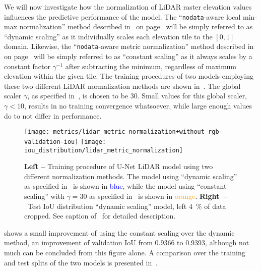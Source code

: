 We will now investigate how the normalization of LiDAR raster elevation values influences the predictive performance of the model.
The \enquote{\texttt{nodata}-aware local min-max normalization} method described in~ on page~\pageref{alg:local-min-max-scaling} will be simply referred to as \enquote{dynamic scaling} as it individually scales each elevation tile to the $[0, 1]$ domain.
Likewise, the \enquote{\texttt{nodata}-aware metric normalization} method described in~ on page~\pageref{alg:metric-normalization} will be simply referred to as \enquote{constant scaling} as it always scales by a constant factor $\gamma^{-1}$ after subtracting the minimum, regardless of maximum elevation within the given tile.
The training procedures of two models employing these two different LiDAR normalization methods are shown in~.
The global scaler $\gamma$, as specified in~, is chosen to be 30.
Small values for this global scaler, $\gamma < 10$, results in no training convergence whatsoever, while large enough values do to not differ in performance.

\begin{figure}[H]
  \centering
  \texttt{[image: metrics/lidar\_metric\_normalization+without\_rgb-validation-iou]}
  \texttt{[image: iou\_distribution/lidar\_metric\_normalization]}
  \caption{%
    \textbf{Left --} Training procedure of U-Net LiDAR model using two different normalization methods.
    The model using \enquote{dynamic scaling} as specified in~ is shown in \textcolor{blue}{blue}, while the model using \enquote{constant scaling} with $\gamma = 30$ as specified in~ is shown in \textcolor{orange}{orange}.
    \textbf{Right~--}~Test IoU distribution \enquote{dynamic scaling} model, left \SI{4}{\percent} of data cropped.
    See caption of~ for detailed description.
  }%
  \label{fig:normalization-training}
\end{figure}

 shows a small improvement of using the constant scaling over the dynamic method, an improvement of validation IoU from \num{0.9366} to \num{0.9393}, although not much can be concluded from this figure alone.
A comparison over the training and test splits of the two models is presented in~.

